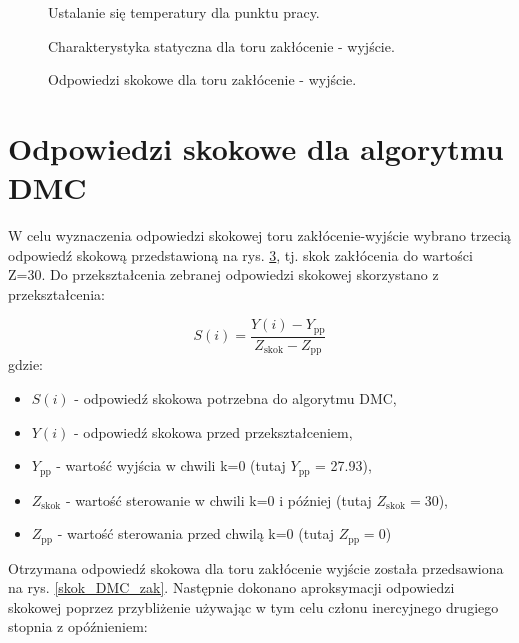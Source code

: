 \documentclass[a4paper,titlepage,11pt,twosides,floatssmall]{mwrep}
\begin{document}
\begin{figure}[H]
	\centering
	
	\caption{Ustalanie się temperatury dla punktu pracy.}
	\label{punkt_pracy}
\end{figure}


\begin{figure}[H]
	\centering
	
	\caption{Charakterystyka statyczna dla toru zakłócenie - wyjście.}
	\label{char_skok_zak}
\end{figure}


\begin{figure}[H]
	\centering
	
	\caption{Odpowiedzi skokowe dla toru zakłócenie - wyjście.}
	\label{skok_zak}
\end{figure}


\section{Odpowiedzi skokowe dla algorytmu DMC}
W celu wyznaczenia odpowiedzi skokowej toru zakłócenie-wyjście wybrano trzecią odpowiedź skokową przedstawioną na rys. \ref{skok_zak}, tj. skok zakłócenia do wartości Z=30. Do przekształcenia zebranej odpowiedzi skokowej skorzystano z przekształcenia:

\begin{equation}
	S(i)= \frac{Y(i) - Y_{\mathrm{pp}}}{Z_{\mathrm{skok}} - Z_{\mathrm{pp}}}
\end{equation}
gdzie:
\begin{itemize}
  \item $S(i)$ - odpowiedź skokowa potrzebna do algorytmu DMC,
	\item $Y(i)$ - odpowiedź skokowa przed przekształceniem,
	\item $Y_{\mathrm{pp}}$ - wartość wyjścia w chwili k=0 (tutaj $Y_{\mathrm{pp}}$  = \num{27.93}),
	\item $Z_{\mathrm{skok}}$ - wartość sterowanie w chwili k=0 i później (tutaj $Z_{\mathrm{skok}} = 30$),
	\item $Z_{\mathrm{pp}}$ - wartość sterowania przed chwilą k=0 (tutaj $Z_{\mathrm{pp}} = 0$)
\end{itemize}

Otrzymana odpowiedź skokowa dla toru zakłócenie wyjście została przedsawiona na rys. \ref{skok_DMC_zak}. Następnie dokonano aproksymacji odpowiedzi skokowej poprzez przybliżenie używając w tym celu członu inercyjnego drugiego stopnia z opóźnieniem:
\end{document}

